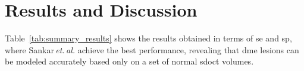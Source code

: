 \section{Results and Discussion}\label{sec:results}\label{sec:discussion}

Table~\ref{tab:summary_results} shows the results obtained in terms of \gls{se} and \gls{sp}, where Sankar\,\emph{et.\,al.} achieve the best performance, revealing that \gls{dme} lesions can be modeled accurately based only on a set of normal \gls{sdoct} volumes.


